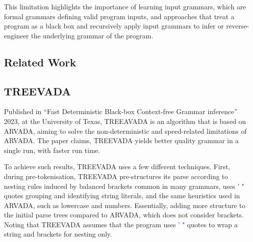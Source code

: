 \vspace{\baselineskip}
This limitation highlights the importance of learning input grammars, which are formal grammars defining valid program inputs, and approaches that treat a program as a black box and recursively apply input grammars to infer or reverse-engineer the underlying grammar of the program.


\subsection{Related Work}

\subsection{TREEVADA}

Published in \enquote{Fast Deterministic Black-box Context-free Grammar inference} 2023, at the University of Texas\cite{arefinFastDeterministicBlackbox2024}, TREEAVADA is an algorithm that is based on ARVADA\cite{kulkarniLearningHighlyRecursive2021}, aiming to solve the non-deterministic and speed-related limitations of ARVADA. The paper claims, TREEVADA yields better quality grammar in a single run, with faster run time.

\vspace{\baselineskip}
To achieve such results, TREEVADA uses a few different techniques. First, during pre-tokenisation, TREEVADA pre-structures its parse according to nesting rules induced by balanced brackets common in many grammars, uses \textcolor{blue}{' "} quotes grouping and identifying string literals, and the same heuristics used in ARVADA, such as lowercase and numbers. Essentially, adding more structure to the initial parse trees compared to ARVADA, which does not consider brackets. Noting that TREEVADA assumes that the program uses \textcolor{blue}{' "} quotes to wrap a string and brackets for nesting only.

